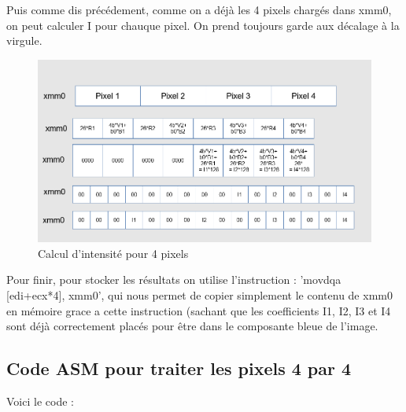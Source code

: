 \documentclass[11pt]{report}
\begin{document}
Puis comme dis précédement, comme on a déjà les 4 pixels chargés dans xmm0, on peut calculer I pour chauque pixel. On prend toujours garde aux décalage à la virgule.


\begin{figure}[h]
\includegraphics[width=13cm]{Capture2.PNG}
\caption{Calcul d'intensité pour 4 pixels}
\end{figure}

\medskip 

Pour finir, pour stocker les résultats on utilise l'instruction : 'movdqa [edi+ecx*4], xmm0', qui nous permet de copier simplement le contenu de xmm0 en mémoire grace a cette instruction (sachant que les coefficients I1, I2, I3 et I4 sont déjà correctement placés pour être dans le composante bleue de l'image. 


\newpage

\subsection{Code ASM pour traiter les pixels 4 par 4}

Voici le code :
\end{document}
